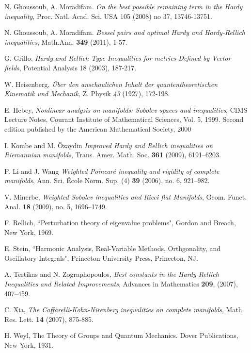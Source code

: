 \documentclass[12pt]{amsart}
\numberwithin{equation}{section}
\numberwithin{theorem}{section}
\numberwithin{theorem}{section} \numberwithin{lemma}{section}
\numberwithin{definition}{section}
\numberwithin{corollary}{section}
\numberwithin{remark}{section}
\numberwithin{proposition}{section}
\begin{document}
\begin{thebibliography}{A}
 N. Ghoussoub, A. Moradifam. \textit{On the best possible remaining term in
the Hardy inequality}, Proc. Natl. Acad. Sci. USA 105 (2008) no 37,
13746-13751.

 N. Ghoussoub, A. Moradifam. \textit{Bessel pairs and optimal Hardy
and Hardy-Rellich inequalities}, Math.Ann. {\bf 349} (2011), 1-57.

 G. Grillo, \textit{ Hardy and Rellich-Type Inequalities for
metrics Defined by Vector fields}, Potential Analysis 18 (2003),
187-217.

 W. Heisenberg,  \textit{\"{U}ber den anschaulichen Inhalt der quantentheoretischen Kinematik und Mechanik},
Z. Physik \textit{43} (1927), 172-198.

 E. Hebey, \textit{Nonlinear analysis on manifolds: Sobolev spaces and inequalities}, CIMS Lecture Notes, Courant Institute of Mathematical Sciences, Vol. 5, 1999. Second edition published by the American Mathematical Society, 2000

 I. Kombe and M. \"Ozaydin  \textit{ Improved Hardy and Rellich inequalities on Riemannian manifolds}, Trans. Amer. Math. Soc. {\bf 361} (2009), 6191--6203.

 P. Li and J. Wang \textit{ Weighted Poincar\'e inequality and rigidity of complete
manifolds},  Ann. Sci. \'Ecole Norm. Sup. (4) {\bf 39} (2006), no.
6, 921--982.

 V. Minerbe, \textit{ Weighted Sobolev
inequalities and Ricci flat Manifolds}, Geom. Funct. Anal. {\bf 18} (2009), no. 5, 1696--1749.

 F. Rellich, ``Perturbation theory of eigenvalue problems", Gordon and
Breach, New York, 1969.

 E. Stein, ``Harmonic Analysis, Real-Variable
Methods, Orthgonality, and Oscillatory Integrals", Princeton
University Press, Princeton, NJ.

 A. Tertikas and N. Zographopoulos, \textit{Best constants in the Hardy-Rellich Inequalities and Related Improvements}, Advances in Mathematics {\bf 209}, (2007), 407--459.

 C. Xia, \textit{The Caffarelli-Kohn-Nirenberg inequalities on complete manifolds}, Math.
Res. Lett. {\bf 14} (2007), 875-885.

 H. Weyl, The Theory of Groups and Quantum Mechanics. Dover
Publications, New York, 1931.

\end{thebibliography}
\end{document}
